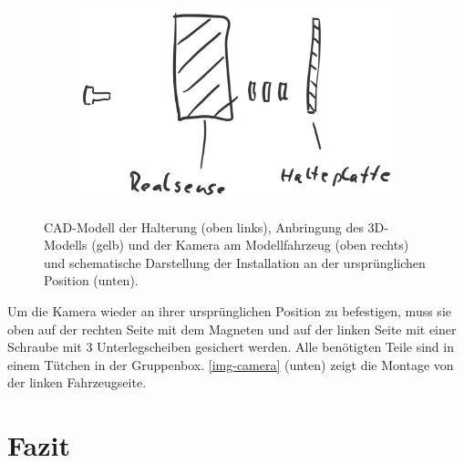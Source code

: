\documentclass[a4paper,12pt]{report}
\begin{document}
\begin{figure}[ht]
\begin{subfigure}{\textwidth}
		\centering
		\includegraphics[width=.5\textwidth]{assets/RealSense-Montage2.PNG}
	\end{subfigure}
	\caption{CAD-Modell der Halterung (oben links), Anbringung des 3D-Modells (gelb) und der Kamera am Modellfahrzeug (oben rechts) und schematische Darstellung der Installation an der ursprünglichen Position (unten).}
	\label{img-camera}
\end{figure}
Um die Kamera wieder an ihrer ursprünglichen Position zu befestigen, muss sie oben auf der rechten Seite mit dem Magneten und auf der linken Seite mit einer Schraube mit 3 Unterlegscheiben gesichert werden. Alle benötigten Teile sind in einem Tütchen in der Gruppenbox. \autoref{img-camera} (unten) zeigt die Montage von der linken Fahrzeugseite.


\chapter{Fazit}

\end{document}
